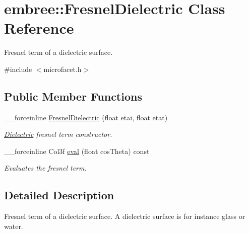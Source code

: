 \hypertarget{classembree_1_1_fresnel_dielectric}{
\section{embree::FresnelDielectric Class Reference}
\label{classembree_1_1_fresnel_dielectric}
}


Fresnel term of a dielectric surface.  




{\ttfamily \#include $<$microfacet.h$>$}

\subsection*{Public Member Functions}
\begin{DoxyCompactItemize}
\item 
\_\-\_\-forceinline \hyperlink{classembree_1_1_fresnel_dielectric_a48b7b5ba52a93aadb00aaf6b1e92586f}{FresnelDielectric} (float etai, float etat)
\begin{DoxyCompactList}\small\item\em \hyperlink{classembree_1_1_dielectric}{Dielectric} fresnel term constructor. \item\end{DoxyCompactList}\item 
\_\-\_\-forceinline Col3f \hyperlink{classembree_1_1_fresnel_dielectric_a5d682ca1a75395b2ffd4e154a2d24bc2}{eval} (float cosTheta) const 
\begin{DoxyCompactList}\small\item\em Evaluates the fresnel term. \item\end{DoxyCompactList}\end{DoxyCompactItemize}


\subsection{Detailed Description}
Fresnel term of a dielectric surface. A dielectric surface is for instance glass or water. 


